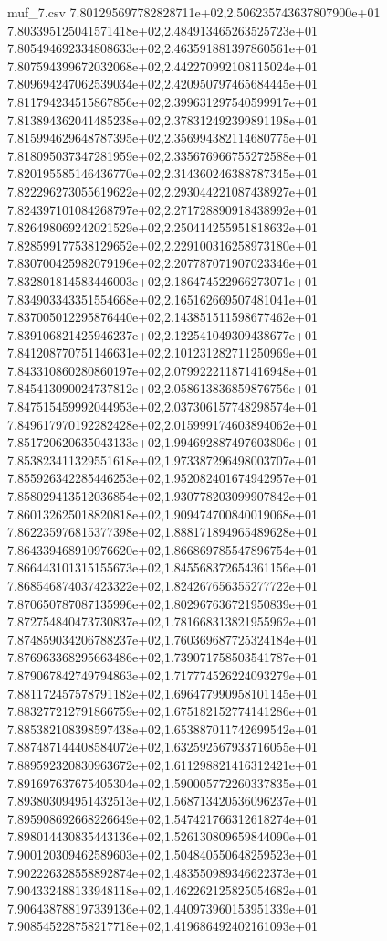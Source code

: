 \begin{filecontents*}{muf_7.csv}
7.801295697782828711e+02,2.506235743637807900e+01
7.803395125041571418e+02,2.484913465263525723e+01
7.805494692334808633e+02,2.463591881397860561e+01
7.807594399672032068e+02,2.442270992108115024e+01
7.809694247062539034e+02,2.420950797465684445e+01
7.811794234515867856e+02,2.399631297540599917e+01
7.813894362041485238e+02,2.378312492399891198e+01
7.815994629648787395e+02,2.356994382114680775e+01
7.818095037347281959e+02,2.335676966755272588e+01
7.820195585146436770e+02,2.314360246388787345e+01
7.822296273055619622e+02,2.293044221087438927e+01
7.824397101084268797e+02,2.271728890918438992e+01
7.826498069242021529e+02,2.250414255951818632e+01
7.828599177538129652e+02,2.229100316258973180e+01
7.830700425982079196e+02,2.207787071907023346e+01
7.832801814583446003e+02,2.186474522966273071e+01
7.834903343351554668e+02,2.165162669507481041e+01
7.837005012295876440e+02,2.143851511598677462e+01
7.839106821425946237e+02,2.122541049309438677e+01
7.841208770751146631e+02,2.101231282711250969e+01
7.843310860280860197e+02,2.079922211871416948e+01
7.845413090024737812e+02,2.058613836859876756e+01
7.847515459992044953e+02,2.037306157748298574e+01
7.849617970192282428e+02,2.015999174603894062e+01
7.851720620635043133e+02,1.994692887497603806e+01
7.853823411329551618e+02,1.973387296498003707e+01
7.855926342285446253e+02,1.952082401674942957e+01
7.858029413512036854e+02,1.930778203099907842e+01
7.860132625018820818e+02,1.909474700840019068e+01
7.862235976815377398e+02,1.888171894965489628e+01
7.864339468910976620e+02,1.866869785547896754e+01
7.866443101315155673e+02,1.845568372654361156e+01
7.868546874037423322e+02,1.824267656355277722e+01
7.870650787087135996e+02,1.802967636721950839e+01
7.872754840473730837e+02,1.781668313821955962e+01
7.874859034206788237e+02,1.760369687725324184e+01
7.876963368295663486e+02,1.739071758503541787e+01
7.879067842749794863e+02,1.717774526224093279e+01
7.881172457578791182e+02,1.696477990958101145e+01
7.883277212791866759e+02,1.675182152774141286e+01
7.885382108398597438e+02,1.653887011742699542e+01
7.887487144408584072e+02,1.632592567933716055e+01
7.889592320830963672e+02,1.611298821416312421e+01
7.891697637675405304e+02,1.590005772260337835e+01
7.893803094951432513e+02,1.568713420536096237e+01
7.895908692668226649e+02,1.547421766312618274e+01
7.898014430835443136e+02,1.526130809659844090e+01
7.900120309462589603e+02,1.504840550648259523e+01
7.902226328558892874e+02,1.483550989346622373e+01
7.904332488133948118e+02,1.462262125825054682e+01
7.906438788197339136e+02,1.440973960153951339e+01
7.908545228758217718e+02,1.419686492402161093e+01

\end{filecontents*}
